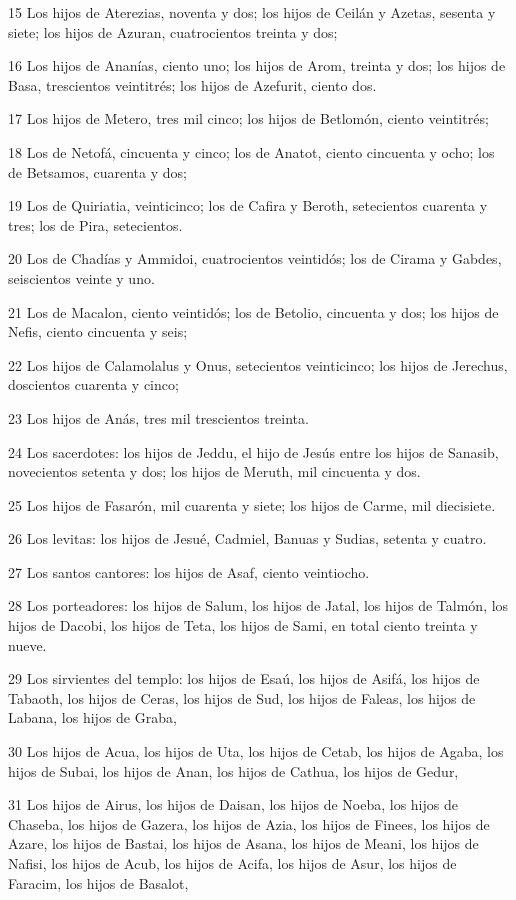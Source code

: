 \par 15 Los hijos de Aterezias, noventa y dos; los hijos de Ceilán y Azetas, sesenta y siete; los hijos de Azuran, cuatrocientos treinta y dos;
\par 16 Los hijos de Ananías, ciento uno; los hijos de Arom, treinta y dos; los hijos de Basa, trescientos veintitrés; los hijos de Azefurit, ciento dos.
\par 17 Los hijos de Metero, tres mil cinco; los hijos de Betlomón, ciento veintitrés;
\par 18 Los de Netofá, cincuenta y cinco; los de Anatot, ciento cincuenta y ocho; los de Betsamos, cuarenta y dos;
\par 19 Los de Quiriatia, veinticinco; los de Cafira y Beroth, setecientos cuarenta y tres; los de Pira, setecientos.
\par 20 Los de Chadías y Ammidoi, cuatrocientos veintidós; los de Cirama y Gabdes, seiscientos veinte y uno.
\par 21 Los de Macalon, ciento veintidós; los de Betolio, cincuenta y dos; los hijos de Nefis, ciento cincuenta y seis;
\par 22 Los hijos de Calamolalus y Onus, setecientos veinticinco; los hijos de Jerechus, doscientos cuarenta y cinco;
\par 23 Los hijos de Anás, tres mil trescientos treinta.
\par 24 Los sacerdotes: los hijos de Jeddu, el hijo de Jesús entre los hijos de Sanasib, novecientos setenta y dos; los hijos de Meruth, mil cincuenta y dos.
\par 25 Los hijos de Fasarón, mil cuarenta y siete; los hijos de Carme, mil diecisiete.
\par 26 Los levitas: los hijos de Jesué, Cadmiel, Banuas y Sudias, setenta y cuatro.
\par 27 Los santos cantores: los hijos de Asaf, ciento veintiocho.
\par 28 Los porteadores: los hijos de Salum, los hijos de Jatal, los hijos de Talmón, los hijos de Dacobi, los hijos de Teta, los hijos de Sami, en total ciento treinta y nueve.
\par 29 Los sirvientes del templo: los hijos de Esaú, los hijos de Asifá, los hijos de Tabaoth, los hijos de Ceras, los hijos de Sud, los hijos de Faleas, los hijos de Labana, los hijos de Graba,
\par 30 Los hijos de Acua, los hijos de Uta, los hijos de Cetab, los hijos de Agaba, los hijos de Subai, los hijos de Anan, los hijos de Cathua, los hijos de Gedur,
\par 31 Los hijos de Airus, los hijos de Daisan, los hijos de Noeba, los hijos de Chaseba, los hijos de Gazera, los hijos de Azia, los hijos de Finees, los hijos de Azare, los hijos de Bastai, los hijos de Asana, los hijos de Meani, los hijos de Nafisi, los hijos de Acub, los hijos de Acifa, los hijos de Asur, los hijos de Faracim, los hijos de Basalot,
